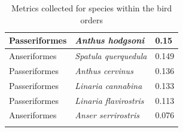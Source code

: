 \documentclass{article}
\begin{document}
\begin{longtable}{|p{} | p{} | p{} |}
  Passeriformes   & \textit{Anthus hodgsoni}               & 0.15                 \\ \hline
  Anseriformes    & \textit{Spatula querquedula}           & 0.149                \\ \hline
  Passeriformes   & \textit{Anthus cervinus}               & 0.136                \\ \hline
  Passeriformes   & \textit{Linaria cannabina}             & 0.133                \\ \hline
  Passeriformes   & \textit{Linaria flavirostris}          & 0.113                \\ \hline
  Anseriformes    & \textit{Anser serrirostris}            & 0.076                \\ \hline


  \caption{\footnotesize Metrics collected for species within the bird orders}
  \label{tab:birdscores}
\end{longtable}
\end{document}
